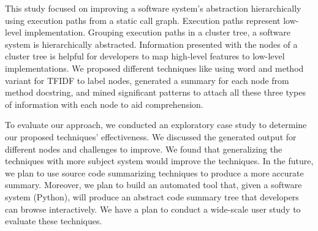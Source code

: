 This study focused on improving a software system's abstraction hierarchically using execution paths from a static call graph. Execution paths represent low-level implementation. Grouping execution paths in a cluster tree, a software system is hierarchically abstracted. Information presented with the nodes of a cluster tree is helpful for developers to map high-level features to low-level implementations. We proposed different techniques like using word and method variant for TFIDF to label nodes, generated a summary for each node from method docstring, and mined significant patterns to attach all these three types of information with each node to aid comprehension.

To evaluate our approach, we conducted an exploratory case study to determine our proposed techniques' effectiveness. We discussed the generated output for different nodes and challenges to improve. We found that generalizing the techniques with more subject system would improve the techniques. In the future, we plan to use source code summarizing techniques \cite{wan2018improvingCodeSummary, ahmad2020transformerCodeSummary, zhu2019automaticSummaryReview} to produce a more accurate summary. Moreover, we plan to build an automated tool that, given a software system (Python), will produce an abstract code summary tree that developers can browse interactively. We have a plan to conduct a wide-scale user study to evaluate these techniques.
